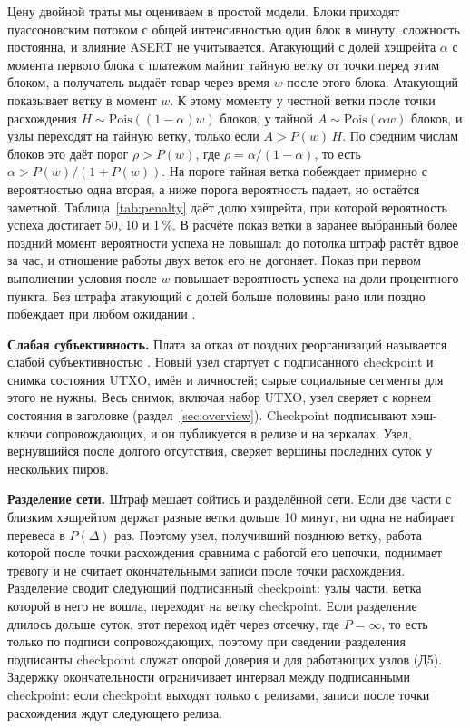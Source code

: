 \documentclass[10pt,a4paper]{article}
\begin{document}
Цену двойной траты мы оцениваем в простой модели.
Блоки приходят пуассоновским потоком с общей интенсивностью один блок в минуту, сложность постоянна, и влияние ASERT не учитывается.
Атакующий с долей хэшрейта $\alpha$ с момента первого блока с платежом майнит тайную ветку от точки перед этим блоком, а получатель выдаёт товар через время $w$ после этого блока.
Атакующий показывает ветку в момент $w$.
К этому моменту у честной ветки после точки расхождения $H\sim\mathrm{Pois}((1-\alpha)w)$ блоков, у тайной $A\sim\mathrm{Pois}(\alpha w)$ блоков, и узлы переходят на тайную ветку, только если $A>P(w)\,H$.
По средним числам блоков это даёт порог $\rho>P(w)$, где $\rho=\alpha/(1-\alpha)$, то есть $\alpha>P(w)/(1+P(w))$.
На пороге тайная ветка побеждает примерно с вероятностью одна вторая, а ниже порога вероятность падает, но остаётся заметной.
Таблица~\ref{tab:penalty} даёт долю хэшрейта, при которой вероятность успеха достигает 50, 10 и 1\,\%.
В расчёте показ ветки в заранее выбранный более поздний момент вероятности успеха не повышал: до потолка штраф растёт вдвое за час, и отношение работы двух веток его не догоняет. Показ при первом выполнении условия после $w$ повышает вероятность успеха на доли процентного пункта.
Без штрафа атакующий с долей больше половины рано или поздно побеждает при любом ожидании \cite{bitcoin,rosenfeld}.

\textbf{Слабая субъективность.}
Плата за отказ от поздних реорганизаций называется слабой субъективностью \cite{weaksubj}.
Новый узел стартует с подписанного checkpoint и снимка состояния UTXO, имён и личностей; сырые социальные сегменты для этого не нужны.
Весь снимок, включая набор UTXO, узел сверяет с корнем состояния в заголовке (раздел~\ref{sec:overview}).
Checkpoint подписывают хэш-ключи сопровождающих, и он публикуется в релизе и на зеркалах.
Узел, вернувшийся после долгого отсутствия, сверяет вершины последних суток у нескольких пиров.

\textbf{Разделение сети.}
Штраф мешает сойтись и разделённой сети.
Если две части с близким хэшрейтом держат разные ветки дольше 10 минут, ни одна не набирает перевеса в $P(\Delta)$ раз.
Поэтому узел, получивший позднюю ветку, работа которой после точки расхождения сравнима с работой его цепочки, поднимает тревогу и не считает окончательными записи после точки расхождения.
Разделение сводит следующий подписанный checkpoint: узлы части, ветка которой в него не вошла, переходят на ветку checkpoint.
Если разделение длилось дольше суток, этот переход идёт через отсечку, где $P=\infty$, то есть только по подписи сопровождающих, поэтому при сведении разделения подписанты checkpoint служат опорой доверия и для работающих узлов (Д5).
Задержку окончательности ограничивает интервал между подписанными checkpoint: если checkpoint выходят только с релизами, записи после точки расхождения ждут следующего релиза.
\end{document}
